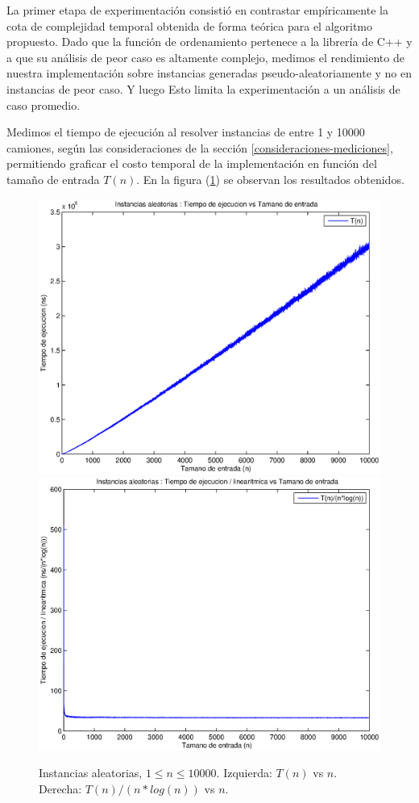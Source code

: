 La primer etapa de experimentación consistió en contrastar empíricamente la cota de complejidad temporal obtenida de forma teórica para el algoritmo propuesto. Dado que la función de ordenamiento pertenece a la librería de C++ y a que su análisis de peor caso es altamente complejo, medimos el rendimiento de nuestra implementación sobre instancias generadas pseudo-aleatoriamente y no en instancias de peor caso. Y luego Esto limita la experimentación a un análisis de caso promedio.

Medimos el tiempo de ejecución al resolver instancias de entre 1 y 10000 camiones, según las consideraciones de la sección \ref{consideraciones-mediciones}, permitiendo graficar el costo temporal de la implementación en función del tamaño de entrada $T(n)$. En la figura (\ref{fig:problema1-aleatoria-10000}) se observan los resultados obtenidos.

\begin{center}
  \begin{figure}[H]
    \includegraphics[width=0.5\linewidth]{problema1/graficos/problema1_aleatoria_10000.eps}
    \includegraphics[width=0.5\linewidth]{problema1/graficos/problema1_aleatoria_10000_div_nlogn.eps}
    \caption{Instancias aleatorias, $1 \leq n \leq 10000$. Izquierda: $T(n)$ vs $n$. Derecha: $T(n) / (n * log(n))$ vs $n$.}
    \label{fig:problema1-aleatoria-10000}
  \end{figure}
\end{center}

